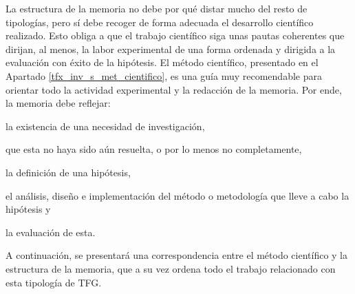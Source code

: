 La estructura de la memoria no debe por qué distar mucho del resto de tipologías, pero sí debe recoger de forma adecuada el desarrollo científico realizado. Esto obliga a que el trabajo científico siga unas pautas coherentes que dirijan, al menos, la labor experimental de una forma ordenada y dirigida a la evaluación con éxito de la hipótesis. El método científico, presentado en el Apartado \ref{tfx_inv_s_met_cientifico}, es una guía muy recomendable para orientar todo la actividad experimental y la redacción de la memoria. Por ende, la memoria debe reflejar: \begin{enumerate*}[label=(\arabic*)]\item la existencia de una necesidad de investigación, \item que esta no haya sido aún resuelta, o por lo menos no completamente, \item la definición de una hipótesis, \item el análisis, diseño e implementación del método o metodología que lleve a cabo la hipótesis y \item la evaluación de esta.\end{enumerate*} A continuación, se presentará una correspondencia entre el método científico y la estructura de la memoria, que a su vez ordena todo el trabajo relacionado con esta tipología de TFG.

